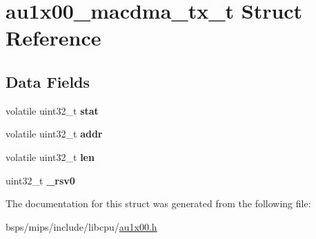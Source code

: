 \hypertarget{structau1x00__macdma__tx__t}{}\section{au1x00\+\_\+macdma\+\_\+tx\+\_\+t Struct Reference}
\label{structau1x00__macdma__tx__t}
\subsection*{Data Fields}
\begin{DoxyCompactItemize}
\item 
\mbox{\label{structau1x00__macdma__tx__t_af053a0dccb41568b64240fb2526539ae}} 
volatile uint32\+\_\+t {\bfseries stat}
\item 
\mbox{\label{structau1x00__macdma__tx__t_a55d4d331404639c3fb0d406fbf2068cd}} 
volatile uint32\+\_\+t {\bfseries addr}
\item 
\mbox{\label{structau1x00__macdma__tx__t_a6827361a8356eaf7c68c18bb9cd67471}} 
volatile uint32\+\_\+t {\bfseries len}
\item 
\mbox{\label{structau1x00__macdma__tx__t_ac84fac3b30e01eee7efa5e898137265c}} 
uint32\+\_\+t {\bfseries \+\_\+rsv0}
\end{DoxyCompactItemize}


The documentation for this struct was generated from the following file\+:\begin{DoxyCompactItemize}
\item 
bsps/mips/include/libcpu/\mbox{\hyperlink{au1x00_8h}{au1x00.\+h}}\end{DoxyCompactItemize}
